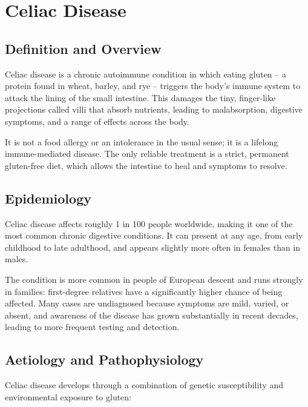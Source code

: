 \chapter{Celiac Disease}

\section*{Definition and Overview}
Celiac disease is a chronic autoimmune condition in which eating gluten -- a protein found in wheat, barley, and rye -- triggers the body's immune system to attack the lining of the small intestine. This damages the tiny, finger-like projections called villi that absorb nutrients, leading to malabsorption, digestive symptoms, and a range of effects across the body.

It is not a food allergy or an intolerance in the usual sense; it is a lifelong immune-mediated disease. The only reliable treatment is a strict, permanent gluten-free diet, which allows the intestine to heal and symptoms to resolve.

\section*{Epidemiology}
Celiac disease affects roughly 1 in 100 people worldwide, making it one of the most common chronic digestive conditions. It can present at any age, from early childhood to late adulthood, and appears slightly more often in females than in males.

The condition is more common in people of European descent and runs strongly in families: first-degree relatives have a significantly higher chance of being affected. Many cases are undiagnosed because symptoms are mild, varied, or absent, and awareness of the disease has grown substantially in recent decades, leading to more frequent testing and detection.

\section*{Aetiology and Pathophysiology}
Celiac disease develops through a combination of genetic susceptibility and environmental exposure to gluten:

